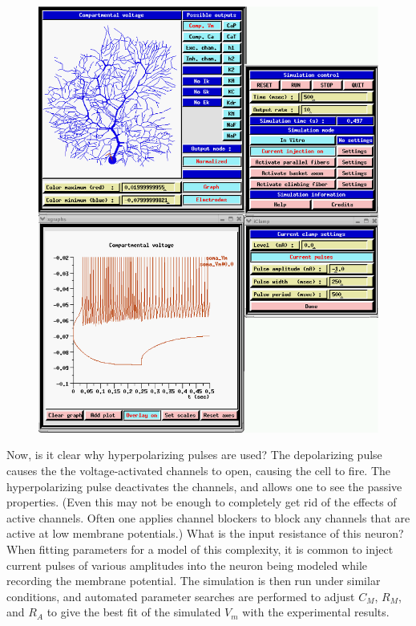 \documentclass[12pt]{article}
\begin{document}
\begin{figure}[h]
  \centering
 \includegraphics[scale=0.38]{figures/purk_inj5.eps}
  \label{fig:purkinj5}
\end{figure}

Now, is it clear why hyperpolarizing pulses are used? The depolarizing pulse causes the the voltage-activated channels to open, causing the cell to fire. The hyperpolarizing pulse deactivates the channels, and allows one to see the passive properties. (Even this may not be enough to completely get rid of the effects of active channels. Often one applies channel blockers to block any channels that are active at low membrane potentials.) What is the input resistance of this neuron? When fitting parameters for a model of this complexity, it is common to inject current pulses of various amplitudes into the neuron being modeled while recording the membrane potential. The simulation is then run under similar conditions, and automated parameter searches are performed to adjust $C_M$, $R_M$, and $R_A$ to give the best fit of the simulated $V_m$ with the experimental results.
\end{document}
